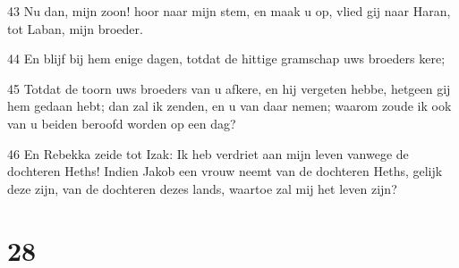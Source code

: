 \par 43 Nu dan, mijn zoon! hoor naar mijn stem, en maak u op, vlied gij naar Haran, tot Laban, mijn broeder.
\par 44 En blijf bij hem enige dagen, totdat de hittige gramschap uws broeders kere;
\par 45 Totdat de toorn uws broeders van u afkere, en hij vergeten hebbe, hetgeen gij hem gedaan hebt; dan zal ik zenden, en u van daar nemen; waarom zoude ik ook van u beiden beroofd worden op een dag?
\par 46 En Rebekka zeide tot Izak: Ik heb verdriet aan mijn leven vanwege de dochteren Heths! Indien Jakob een vrouw neemt van de dochteren Heths, gelijk deze zijn, van de dochteren dezes lands, waartoe zal mij het leven zijn?

\chapter{28}


